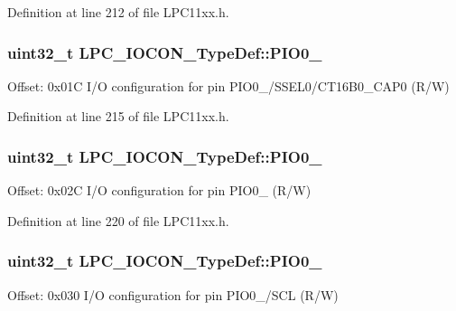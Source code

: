 Definition at line 212 of file L\+P\+C11xx.\+h.

\subsubsection[{\texorpdfstring{P\+I\+O0\+\_\+2}{PIO0_2}}]{ uint32\+\_\+t L\+P\+C\+\_\+\+I\+O\+C\+O\+N\+\_\+\+Type\+Def\+::\+P\+I\+O0\+\_}\hypertarget{group___l_p_c11xx___definitions_ga21ff4df0d6572840ce3f9613fe1c5ef0}{}\label{group___l_p_c11xx___definitions_ga21ff4df0d6572840ce3f9613fe1c5ef0}
Offset\+: 0x01C I/O configuration for pin P\+I\+O0\+\_/\+S\+S\+E\+L0/\+C\+T16\+B0\+\_\+\+C\+A\+P0 (R/W) 

Definition at line 215 of file L\+P\+C11xx.\+h.

\subsubsection[{\texorpdfstring{P\+I\+O0\+\_\+3}{PIO0_3}}]{ uint32\+\_\+t L\+P\+C\+\_\+\+I\+O\+C\+O\+N\+\_\+\+Type\+Def\+::\+P\+I\+O0\+\_}\hypertarget{group___l_p_c11xx___definitions_ga76725f15077b4abb458e593cd3ddf3c8}{}\label{group___l_p_c11xx___definitions_ga76725f15077b4abb458e593cd3ddf3c8}
Offset\+: 0x02C I/O configuration for pin P\+I\+O0\+\_ (R/W) 

Definition at line 220 of file L\+P\+C11xx.\+h.

\subsubsection[{\texorpdfstring{P\+I\+O0\+\_\+4}{PIO0_4}}]{ uint32\+\_\+t L\+P\+C\+\_\+\+I\+O\+C\+O\+N\+\_\+\+Type\+Def\+::\+P\+I\+O0\+\_}\hypertarget{group___l_p_c11xx___definitions_ga9c88b803f94450f62ead1a9286275696}{}\label{group___l_p_c11xx___definitions_ga9c88b803f94450f62ead1a9286275696}
Offset\+: 0x030 I/O configuration for pin P\+I\+O0\+\_/\+S\+CL (R/W) 

